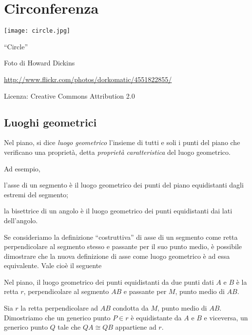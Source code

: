 \chapter{Circonferenza}

\texttt{[image: circle.jpg]}
  \begin{center}
    {\large ``Circle''}\par
    Foto di Howard Dickins\par
    \url{http://www.flickr.com/photos/dorkomatic/4551822855/}\par
    Licenza: Creative Commons Attribution 2.0\par
  \end{center}
\newpage

\section{Luoghi geometrici}

\begin{definizione}
Nel piano, si dice \emph{luogo geometrico} l'insieme di tutti e soli i punti del piano che verificano una proprietà, detta \emph{proprietà caratteristica} del luogo geometrico.
\end{definizione}
Ad esempio,
\begin{itemize*}
\item l'asse di un segmento è il luogo geometrico dei punti del piano equidistanti dagli estremi del segmento;
\item la bisettrice di un angolo è il luogo geometrico dei punti equidistanti dai lati dell'angolo.
\end{itemize*}
Se consideriamo la definizione ``costruttiva'' di asse di un segmento come retta perpendicolare al segmento stesso e passante per il suo punto medio, è possibile dimostrare che la nuova definizione di asse come luogo geometrico è ad essa equivalente.
Vale cioè il seguente
\begin{teorema}
Nel piano, il luogo geometrico dei punti equidistanti da due punti dati $A$ e $B$ è la retta $r$, perpendicolare al segmento $AB$ e passante per $M$, punto medio di $AB$.
\end{teorema}
Sia $r$ la retta perpendicolare ad $AB$ condotta da $M$, punto medio di $AB$. Dimostriamo che un generico punto $P\in r$ è equidistante da $A$ e $B$ e viceversa, un generico punto $Q$ tale che $QA\cong QB$ appartiene ad $r$.
~\\

